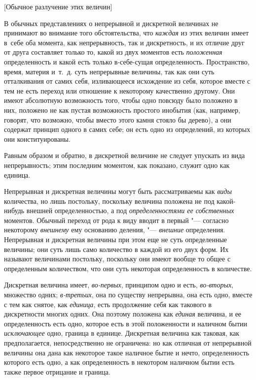 %
{[Обычное разлучение этих величин]}

В обычных представлениях о непрерывной и дискретной величинах не принимают во
внимание того обстоятельства, что {\em каждая} из этих величин имеет в~себе оба
момента, как непрерывность, так и дискретность, и их отличие друг от друга
составляет только то, какой из двух моментов есть {\em положенная}
определенность и какой есть только в-себе-сущая определенность. Пространство,
время, материя и~т.~д. суть непрерывные величины, так как они суть отталкивания
от самих себя, изливающееся исхождение из себя, которое вместе с тем не есть
переход или отношение к некоторому качественно другому. Они имеют абсолютную
возможность того, чтобы одно повсюду было положено в них, положено не как
пустая возможность простого инобытия (как, например, говорят, что возможно,
чтобы вместо этого камня стояло бы дерево), а они содержат принцип одного в
самих себе; он есть одно из определений, из которых они конституированы.

Равным образом и обратно, в дискретной величине не следует упускать из вида
непрерывность; этим последним моментом, как показано, служит одно как единица.

Непрерывная и дискретная величины могут быть рассматриваемы как {\em виды}
количества, но лишь постольку, поскольку величина положена не под какой-нибудь
внешней определенностью, а под {\em определенностями ее собственных} моментов.
Обычный переход от рода к виду вводит в первый "--- согласно некоторому
{\em внешнему} ему основанию деления, "--- {\em внешние} определения.
Непрерывная и дискретная величины при этом еще не суть определенные величины;
они суть лишь само количество в каждой из его двух форм. Их называют величинами
постольку, поскольку они имеют вообще то общее с определенным количеством, что
они суть некоторая определенность в количестве.


Дискретная величина имеет, {\em во-первых}, принципом одно и есть,
{\em во-вторых}, множество одних; {\em в-третьих}, она по существу непрерывна,
она есть одно, вместе с тем как снятое, как {\em единица}, есть продолжение
себя как такового в дискретности многих одних. Она поэтому положена как
{\em единая} величина, и ее определенность есть одно, которое есть в этой
положенности и наличном бытии {\em исключающее} одно, граница в единице.
Дискретная величина как таковая, как предполагается, непосредственно не
ограничена: но как отличная от непрерывной величины она дана как некоторое
такое наличное бытие и нечто, определенность которого есть одно, а как
определенность в некотором наличном бытии есть также первое
отрицание и граница.


